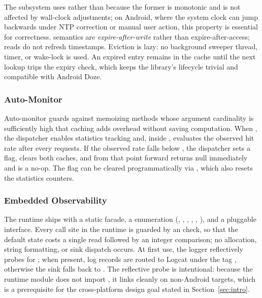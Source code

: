 The subsystem uses  rather than  because the former is monotonic and is not affected by wall-clock adjustments; on Android, where the system clock can jump backwards under NTP correction or manual user action, this property is essential for correctness. \ttl semantics are \emph{expire-after-write} rather than expire-after-access; reads do not refresh timestamps. Eviction is lazy: no background sweeper thread, timer, or wake-lock is used. An expired entry remains in the cache until the next lookup trips the expiry check, which keeps the library's lifecycle trivial and compatible with Android Doze.

\subsubsection{Auto-Monitor}\label{sec:automon}

Auto-monitor guards against memoizing methods whose argument cardinality is sufficiently high that caching adds overhead without saving computation. When , the dispatcher enables statistics tracking and, inside , evaluates the observed hit rate after every  requests. If the observed rate falls below , the dispatcher sets a   flag, clears both caches, and from that point forward  returns null immediately and  is a no-op. The flag can be cleared programmatically via , which also resets the statistics counters.

\subsubsection{Embedded Observability}\label{sec:observability}

The runtime ships with a  static facade, a  enumeration (, , , , , ), and a pluggable  interface. Every call site in the runtime is guarded by an  check, so that the default  state costs a single  read followed by an integer comparison; no allocation, string formatting, or sink dispatch occurs. At first use, the logger reflectively probes for ; when present, log records are routed to Logcat under the tag , otherwise the sink falls back to . The reflective probe is intentional: because the runtime module does not import , it links cleanly on non-Android \jvm targets, which is a prerequisite for the cross-platform design goal stated in Section~\ref{sec:intro}.

